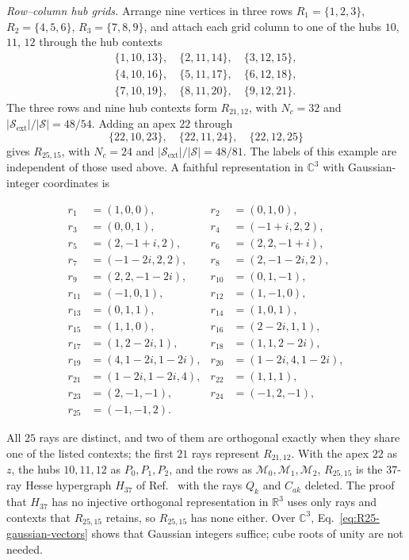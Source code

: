 \documentclass[aps,pra,reprint,superscriptaddress,longbibliography,nofootinbib,floatfix,10pt]{revtex4-2}
\theoremstyle{definition}\newtheorem{definition}[theorem]{Definition}
\theoremstyle{remark}\newtheorem{remark}[theorem]{Remark}
\newcommand{\C}{\mathbb C}\newcommand{\R}{\mathbb R}\newcommand{\Q}{\mathbb Q}
\newcommand{\Sc}{\mathcal S}\newcommand{\Cc}{\mathcal C}\newcommand{\Wc}{\mathcal W}
\begin{document}
\emph{Row--column hub grids.} Arrange nine vertices in three rows $R_1=\{1,2,3\}$, $R_2=\{4,5,6\}$, $R_3=\{7,8,9\}$, and attach each grid column to one of the hubs $10$, $11$, $12$ through the hub contexts
\begin{equation}\label{eq:R21-hub-contexts}
\begin{gathered}
\{1,10,13\},\quad\{2,11,14\},\quad\{3,12,15\},\\
\{4,10,16\},\quad\{5,11,17\},\quad\{6,12,18\},\\
\{7,10,19\},\quad\{8,11,20\},\quad\{9,12,21\}.
\end{gathered}
\end{equation}
The three rows and nine hub contexts form $R_{21,12}$, with $N_c=32$ and $|\Sc_{\mathrm{ext}}|/|\Sc|=48/54$. Adding an apex $22$ through
\begin{equation}\label{eq:R25-extra-contexts}
\{22,10,23\},\quad\{22,11,24\},\quad\{22,12,25\}
\end{equation}
gives $R_{25,15}$, with $N_c=24$ and $|\Sc_{\mathrm{ext}}|/|\Sc|=48/81$. The labels of this example are independent of those used above. A faithful representation in $\C^3$ with Gaussian-integer coordinates is

\begin{equation}\label{eq:R25-gaussian-vectors}
\begin{aligned}
r_1&=(1,0,0),&r_2&=(0,1,0),\\
r_3&=(0,0,1),&r_4&=(-1+i,2,2),\\
r_5&=(2,-1+i,2),&r_6&=(2,2,-1+i),\\
r_7&=(-1-2i,2,2),&r_8&=(2,-1-2i,2),\\
r_9&=(2,2,-1-2i),&r_{10}&=(0,1,-1),\\
r_{11}&=(-1,0,1),&r_{12}&=(1,-1,0),\\
r_{13}&=(0,1,1),&r_{14}&=(1,0,1),\\
r_{15}&=(1,1,0),&r_{16}&=(2-2i,1,1),\\
r_{17}&=(1,2-2i,1),&r_{18}&=(1,1,2-2i),\\
r_{19}&=(4,1-2i,1-2i),&r_{20}&=(1-2i,4,1-2i),\\
r_{21}&=(1-2i,1-2i,4),&r_{22}&=(1,1,1),\\
r_{23}&=(2,-1,-1),&r_{24}&=(-1,2,-1),\\
r_{25}&=(-1,-1,2).&&
\end{aligned}
\end{equation}

All $25$ rays are distinct, and two of them are orthogonal exactly when they share one of the listed contexts; the first $21$ rays represent $R_{21,12}$. With the apex $22$ as $z$, the hubs $10,11,12$ as $P_0,P_1,P_2$, and the rows as $\mathcal M_0,\mathcal M_1,\mathcal M_2$, $R_{25,15}$ is the $37$-ray Hesse hypergraph $H_{37}$ of Ref.~\cite{svozil-2026-chromaticcoordinatization} with the rays $Q_k$ and $C_{ak}$ deleted. The proof that $H_{37}$ has no injective orthogonal representation in $\R^3$ uses only rays and contexts that $R_{25,15}$ retains, so $R_{25,15}$ has none either. Over $\C^3$, Eq.~\eqref{eq:R25-gaussian-vectors} shows that Gaussian integers suffice; cube roots of unity are not needed.
\end{document}
